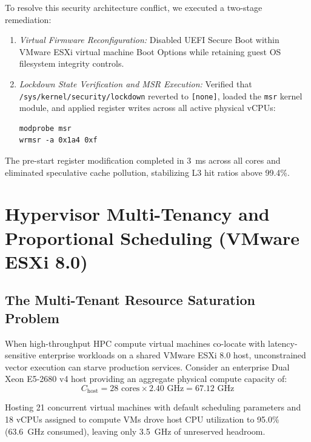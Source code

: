 \documentclass[journal]{IEEEtran}
\begin{document}
To resolve this security architecture conflict, we executed a two-stage remediation:
\begin{enumerate}
\item \textit{Virtual Firmware Reconfiguration:} Disabled UEFI Secure Boot within VMware ESXi virtual machine Boot Options while retaining guest OS filesystem integrity controls.
\item \textit{Lockdown State Verification and MSR Execution:} Verified that \texttt{/sys/kernel/security/lockdown} reverted to \texttt{[none]}, loaded the \texttt{msr} kernel module, and applied register writes across all active physical vCPUs:
\begin{verbatim}
modprobe msr
wrmsr -a 0x1a4 0xf
\end{verbatim}
\end{enumerate}

The pre-start register modification completed in 3~ms across all cores and eliminated speculative cache pollution, stabilizing L3 hit ratios above 99.4\%.

\section{Hypervisor Multi-Tenancy and Proportional Scheduling (VMware ESXi 8.0)}

\subsection{The Multi-Tenant Resource Saturation Problem}
When high-throughput HPC compute virtual machines co-locate with latency-sensitive enterprise workloads on a shared VMware ESXi 8.0 host, unconstrained vector execution can starve production services. Consider an enterprise Dual Xeon E5-2680 v4 host providing an aggregate physical compute capacity of:
\begin{equation}
C_{\text{host}} = 28\text{ cores} \times 2.40\text{ GHz} = 67.12\text{ GHz}
\end{equation}

Hosting 21 concurrent virtual machines with default scheduling parameters and 18 vCPUs assigned to compute VMs drove host CPU utilization to 95.0\% (63.6~GHz consumed), leaving only 3.5~GHz of unreserved headroom.
\end{document}
